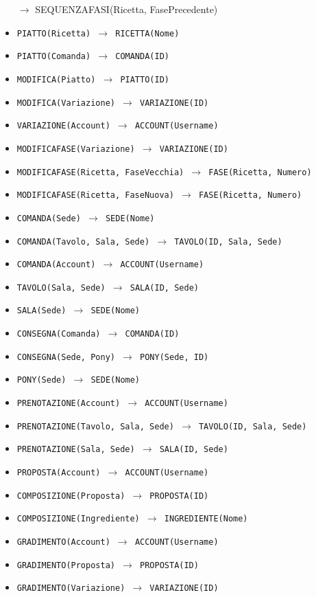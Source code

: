 \begin{itemize}[parsep=0pt,listparindent=9\parindent]
        $\rightarrow$ SEQUENZAFASI(Ricetta, FasePrecedente)
    \item\tt PIATTO(Ricetta) $\rightarrow$ RICETTA(Nome)
    \item\tt PIATTO(Comanda) $\rightarrow$ COMANDA(ID)
    \item\tt MODIFICA(Piatto) $\rightarrow$ PIATTO(ID)
    \item\tt MODIFICA(Variazione) $\rightarrow$ VARIAZIONE(ID)
    \item\tt VARIAZIONE(Account) $\rightarrow$ ACCOUNT(Username)
    \item\tt MODIFICAFASE(Variazione) $\rightarrow$ VARIAZIONE(ID)
    \item\tt MODIFICAFASE(Ricetta, FaseVecchia) $\rightarrow$ FASE(Ricetta, Numero)
    \item\tt MODIFICAFASE(Ricetta, FaseNuova) $\rightarrow$ FASE(Ricetta, Numero)
    \item\tt COMANDA(Sede) $\rightarrow$ SEDE(Nome)
    \item\tt COMANDA(Tavolo, Sala, Sede) $\rightarrow$ TAVOLO(ID, Sala, Sede)
    \item\tt COMANDA(Account) $\rightarrow$ ACCOUNT(Username)
    \item\tt TAVOLO(Sala, Sede) $\rightarrow$ SALA(ID, Sede)
    \item\tt SALA(Sede) $\rightarrow$ SEDE(Nome)
    \item\tt CONSEGNA(Comanda) $\rightarrow$ COMANDA(ID)
    \item\tt CONSEGNA(Sede, Pony) $\rightarrow$ PONY(Sede, ID)
    \item\tt PONY(Sede) $\rightarrow$ SEDE(Nome)
    \item\tt PRENOTAZIONE(Account) $\rightarrow$ ACCOUNT(Username)
    \item\tt PRENOTAZIONE(Tavolo, Sala, Sede) $\rightarrow$ TAVOLO(ID, Sala, Sede)
    \item\tt PRENOTAZIONE(Sala, Sede) $\rightarrow$ SALA(ID, Sede)
    \item\tt PROPOSTA(Account) $\rightarrow$ ACCOUNT(Username)
    \item\tt COMPOSIZIONE(Proposta) $\rightarrow$ PROPOSTA(ID)
    \item\tt COMPOSIZIONE(Ingrediente) $\rightarrow$ INGREDIENTE(Nome)
    \item\tt GRADIMENTO(Account) $\rightarrow$ ACCOUNT(Username)
    \item\tt GRADIMENTO(Proposta) $\rightarrow$ PROPOSTA(ID)
    \item\tt GRADIMENTO(Variazione) $\rightarrow$ VARIAZIONE(ID)

\end{itemize}
